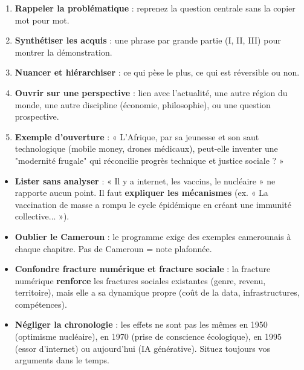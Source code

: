 \documentclass[11pt]{article}
\begin{document}
\begin{methode}
\begin{enumerate}
    \item \textbf{Rappeler la problématique} : reprenez la question centrale sans la copier mot pour mot.
    \item \textbf{Synthétiser les acquis} : une phrase par grande partie (I, II, III) pour montrer la démonstration.
    \item \textbf{Nuancer et hiérarchiser} : ce qui pèse le plus, ce qui est réversible ou non.
    \item \textbf{Ouvrir sur une perspective} : lien avec l'actualité, une autre région du monde, une autre discipline (économie, philosophie), ou une question prospective.
    \item \textbf{Exemple d'ouverture} : « L'Afrique, par sa jeunesse et son saut technologique (mobile money, drones médicaux), peut-elle inventer une "modernité frugale" qui réconcilie progrès technique et justice sociale ? »
\end{enumerate}
\end{methode}

\begin{attention}
\begin{itemize}
    \item \textbf{Lister sans analyser} : « Il y a internet, les vaccins, le nucléaire » ne rapporte aucun point. Il faut \textbf{expliquer les mécanismes} (ex. « La vaccination de masse a rompu le cycle épidémique en créant une immunité collective... »).
    \item \textbf{Oublier le Cameroun} : le programme exige des exemples camerounais à chaque chapitre. Pas de Cameroun = note plafonnée.
    \item \textbf{Confondre fracture numérique et fracture sociale} : la fracture numérique \textbf{renforce} les fractures sociales existantes (genre, revenu, territoire), mais elle a sa dynamique propre (coût de la data, infrastructures, compétences).
    \item \textbf{Négliger la chronologie} : les effets ne sont pas les mêmes en 1950 (optimisme nucléaire), en 1970 (prise de conscience écologique), en 1995 (essor d'internet) ou aujourd'hui (IA générative). Situez toujours vos arguments dans le temps.
\end{itemize}
\end{attention}
\end{document}
